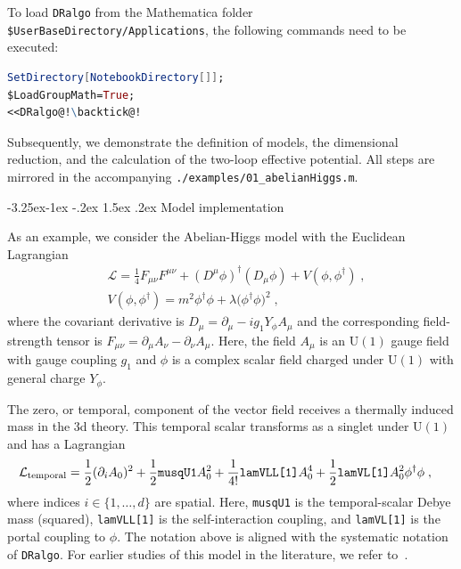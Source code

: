 \documentclass[11pt]{article}
\makeatletter
\def\dralgo{{\tt DRalgo}}
\renewcommand{\rmi}[1]{{\mbox{\scriptsize #1}}}
\renewcommand\subsection{\@startsection{subsection}{2}{\z@}%
  {-3.25ex\@plus -1ex \@minus -.2ex}%
  {1.5ex \@plus .2ex}%
  {\normalfont\normalsize\bfseries}}
\makeatother
\begin{document}
To load \dralgo{} from the Mathematica folder
{\verb!$UserBaseDirectory/Applications!},
the following commands need to be executed:
\begin{lstlisting}[language=Mathematica]
SetDirectory[NotebookDirectory[]];
$LoadGroupMath=True;
<<DRalgo@!\backtick@!
\end{lstlisting}
Subsequently, we demonstrate 
the definition of models,
the dimensional reduction, and
the calculation of the two-loop effective potential.
All steps are mirrored in the accompanying
{\tt ./examples/01\_abelianHiggs.m}.

\subsection{Model implementation}

As an example, we consider
the Abelian-Higgs model with the Euclidean Lagrangian 
\begin{align}
\label{eq:L:ah}
&  \mathcal{L} =
     \frac{1}{4}F_{\mu \nu}F^{\mu \nu}
    + \left(D^\mu \phi\right)^\dagger\left(D_\mu\phi\right)
    + V(\phi,\phi^\dagger)
  \;, \\
&V(\phi,\phi^\dagger) =
      m^2 \phi^{\dagger}\phi
    + \lambda\bigl(\phi^\dagger\phi\bigr)^2
  \;,
\end{align}
where
the covariant derivative is
$D_\mu = \partial_\mu - i g_1 Y_\phi A_\mu$ and 
the corresponding field-strength tensor is 
$F_{\mu \nu} =\partial_\mu A_\nu-\partial_\nu A_\mu$.
Here, the field
$A_\mu$ is an $\mathrm{U}(1)$ gauge field with gauge coupling $g_1$ and
$\phi$ is a complex scalar field charged under $\mathrm{U}(1)$ with general charge $Y_\phi$.

The zero, or temporal, component of the vector field
receives a thermally induced mass in the 3d theory.
This temporal scalar transforms as a singlet under $\mathrm{U}(1)$ and has
a Lagrangian
\begin{align}
\mathcal{L}_{\rmi{temporal}} &=
    \frac{1}{2} (\partial_i A_0)^2
  + \frac{1}{2} {\tt musqU1} A^2_0
  + \frac{1}{4!} \texttt{lamVLL[1]} A^4_0
  + \frac{1}{2} \texttt{lamVL[1]} A^2_0 \phi^\dagger \phi
  \;,
\end{align}
where indices $i\in \{1,\dots,d\}$ are spatial.
Here,
{\tt musqU1} is the temporal-scalar Debye mass (squared),
{\tt lamVLL[1]} is the self-interaction coupling, and 
{\tt lamVL[1]} is the portal coupling to $\phi$.
The notation above is aligned with the systematic notation of \dralgo{}.
For earlier studies of this model in the literature, we refer to~\cite{%
  Andersen:1996dh,Andersen:1997ba,Kajantie:1997hn,Hirvonen:2021zej,Karjalainen:1996rk}.
\end{document}
